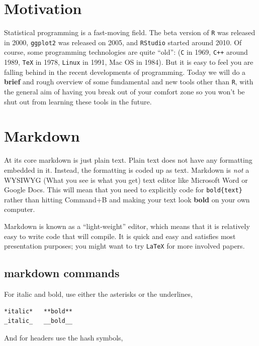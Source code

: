 \documentclass[
  letterpaper,
]{book}
\theoremstyle{definition}
\theoremstyle{definition}
\theoremstyle{plain}
\theoremstyle{definition}
\theoremstyle{plain}
\theoremstyle{plain}
\theoremstyle{remark}
\begin{document}
\hypertarget{motivation}{%
\section{Motivation}\label{motivation}}

Statistical programming is a fast-moving field. The beta version of
\texttt{R} was released in 2000, \texttt{ggplot2} was released on 2005,
and \texttt{RStudio} started around 2010. Of course, some programming
technologies are quite ``old'': (\texttt{C} in 1969, \texttt{C++} around
1989, \texttt{TeX} in 1978, \texttt{Linux} in 1991, Mac OS in 1984). But
it is easy to feel you are falling behind in the recent developments of
programming. Today we will do a \textbf{brief} and rough overview of
some fundamental and new tools other than \texttt{R}, with the general
aim of having you break out of your comfort zone so you won't be shut
out from learning these tools in the future.

\hypertarget{markdown}{%
\section{Markdown}\label{markdown}}

At its core markdown is just plain text. Plain text does not have any
formatting embedded in it. Instead, the formatting is coded up as text.
Markdown is \emph{not} a WYSIWYG (What you see is what you get) text
editor like Microsoft Word or Google Docs. This will mean that you need
to explicitly code for \texttt{bold\{text\}} rather than hitting
Command+B and making your text look \textbf{bold} on your own computer.

Markdown is known as a ``light-weight'' editor, which means that it is
relatively easy to write code that will compile. It is quick and easy
and satisfies most presentation purposes; you might want to try
\texttt{LaTeX} for more involved papers.

\hypertarget{markdown-commands}{%
\subsection{markdown commands}\label{markdown-commands}}

For italic and bold, use either the asterisks or the underlines,

\begin{verbatim}
*italic*   **bold**
_italic_   __bold__
\end{verbatim}

And for headers use the hash symbols,
\end{document}
